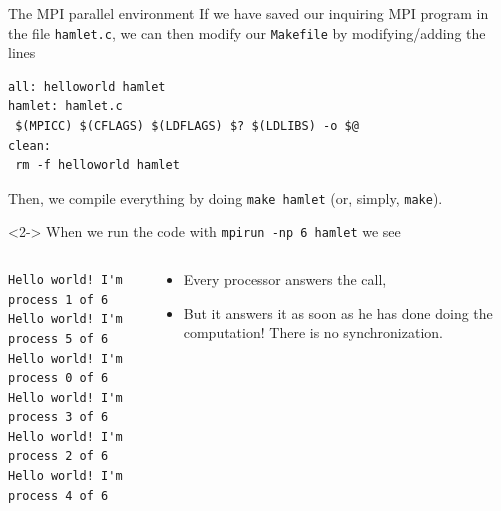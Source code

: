 \documentclass[xcolor={svgnames,usenames}]{beamer}
\begin{document}
\begin{frame}[fragile]{The MPI parallel environment}
If we have saved our inquiring MPI program in the file \texttt{hamlet.c}, we can then modify our \texttt{Makefile} by modifying/adding the lines
\begin{verbatim}
all: helloworld hamlet
hamlet: hamlet.c
 $(MPICC) $(CFLAGS) $(LDFLAGS) $? $(LDLIBS) -o $@
clean:
 rm -f helloworld hamlet
\end{verbatim}
Then, we compile everything by doing \texttt{make hamlet} (or, simply, \texttt{make}).

\begin{onlyenv}<2->
When we run the code with \texttt{mpirun -np 6 hamlet} we see
\begin{columns}
\begin{column}{0.5\columnwidth}
\begin{verbatim}
Hello world! I'm process 1 of 6
Hello world! I'm process 5 of 6
Hello world! I'm process 0 of 6
Hello world! I'm process 3 of 6
Hello world! I'm process 2 of 6
Hello world! I'm process 4 of 6
\end{verbatim}
\end{column}
\begin{column}{0.5\columnwidth}
\begin{itemize}
	\item<3-> Every processor answers the call,
	\item<4-> But it answers it as soon as he has done doing the computation! There is \alert{no synchronization}.
\end{itemize}
\end{column}
\end{columns}
\end{onlyenv}
\end{frame}
\end{document}
